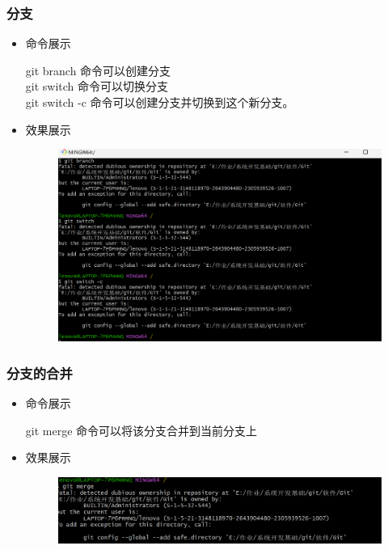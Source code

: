 \documentclass[UTF8]{ctexart}
\begin{document}
\subsubsection{分支}
\begin{itemize}
  \item 命令展示
 
     git branch 命令可以创建分支\\
     git switch 命令可以切换分支\\
     git switch -c 命令可以创建分支并切换到这个新分支。
\item 效果展示
 \begin{figure}[H]
\includegraphics[width=1\textwidth]{4}
\end{figure}
\end{itemize}

\subsubsection{分支的合并}
\begin{itemize}
  \item 命令展示
 
     git merge 命令可以将该分支合并到当前分支上
\item 效果展示
 \begin{figure}[H]
\includegraphics[width=1\textwidth]{5}
\end{figure}
\end{itemize}
\end{document}
